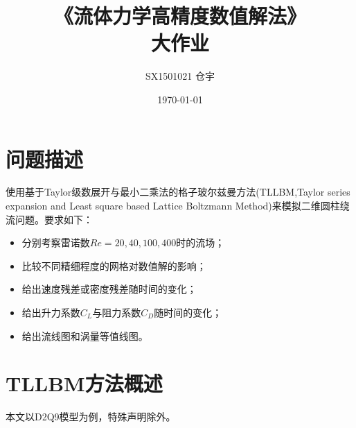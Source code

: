 \documentclass[UTF8]{ctexart}
\title{\heiti 《流体力学高精度数值解法》 \\ 大作业}
\author{SX1501021 仓宇}
\date{\today}
\begin{document}
\maketitle
\setcounter{page}{0}
\thispagestyle{empty}
\clearpage

\tableofcontents
\clearpage

\section{问题描述}
使用基于Taylor级数展开与最小二乘法的格子玻尔兹曼方法(TLLBM,Taylor series expansion and Least square based Lattice Boltzmann Method)来模拟二维圆柱绕流问题。要求如下：
\begin{itemize}
\item 分别考察雷诺数$Re=20,40,100,400$时的流场；
\item 比较不同精细程度的网格对数值解的影响；
\item 给出速度残差或密度残差随时间的变化；
\item 给出升力系数$C_L$与阻力系数$C_D$随时间的变化；
\item 给出流线图和涡量等值线图。
\end{itemize}

\section{TLLBM方法概述}
本文以D2Q9模型为例，特殊声明除外。
\end{document}
